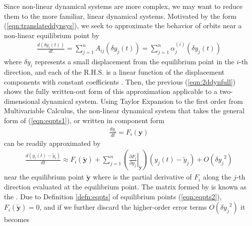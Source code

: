 Since non-linear dynamical systems are more complex, we may want to reduce them to the more familiar, linear dynamical systems. Motivated by the form (\ref{eqn:translateddynsys}), we seek to approximate the behavior of orbits near a non-linear equilibrium point by
\begin{align}
\frac{d(\delta y_i(t))}{dt} = \sum_{j=1}^{n} A_{ij}(\delta y_j (t)) = \sum_{j=1}^{n} \alpha_{j}^{(i)}(\delta y_j(t)) \label{eqn:dynapproxproto}
\end{align}
where $\delta y_i$ represents a small displacement from the equilibrium point in the $i$-th direction, and each of the R.H.S. is a linear function of the displacement components with constant coefficients . Then, the previous (\ref{eqn:2ddynfull}) shows the fully written-out form of this approximation applicable to a two-dimensional dynamical system. Using Taylor Expansion to the first order from Multivariable Calculus, the non-linear dynamical system that takes the general form of (\ref{eqn:eqpts1}), or written in component form 
\begin{align}
\frac{d y_i}{dt} = F_i(\textbf{y})
\end{align}
can be readily approximated by
\begin{align}
\frac{d(y_i(t) - \tilde{y}_i)}{dt} \approx F_i(\tilde{\textbf{y}}) + \sum_{j=1}^{n} \left(\left.\frac{\partial F_i}{\partial y_j}\right|_{\tilde{\textbf{y}}}\right) (y_j(t) - \tilde{y}_j) + O({\delta y_j}^2)
\end{align}
near the equilibrium point $\tilde{\textbf{y}}$ where  is the partial derivative of $F_i$ along the $j$-th direction evaluated at the equilibrium point. The matrix formed by  is known as the . Due to Definition \ref{defn:eqpts} of equilibrium points (\ref{eqn:eqpts2}), $F_i(\tilde{\textbf{y}}) = 0$, and if we further discard the higher-order error terms $O({\delta y_j}^2)$ it becomes
